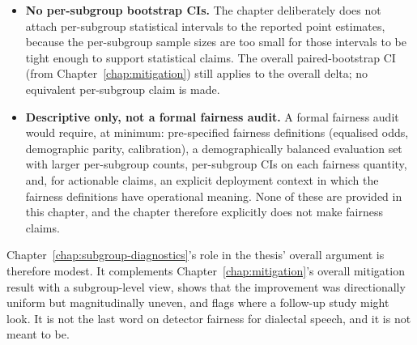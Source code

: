 \begin{itemize}
    \item \textbf{No per-subgroup bootstrap CIs.} The chapter deliberately
        does not attach per-subgroup statistical intervals to the
        reported point estimates, because the per-subgroup sample
        sizes are too small for those intervals to be tight enough to
        support statistical claims. The overall paired-bootstrap CI
        (from Chapter~\ref{chap:mitigation}) still applies to the overall delta; no
        equivalent per-subgroup claim is made.
    \item \textbf{Descriptive only, not a formal fairness audit.} A formal
        fairness audit would require, at minimum: pre-specified
        fairness definitions (equalised odds, demographic parity,
        calibration), a demographically balanced evaluation set with
        larger per-subgroup counts, per-subgroup CIs on each fairness
        quantity, and, for actionable claims, an explicit deployment
        context in which the fairness definitions have operational
        meaning. None of these are provided in this chapter, and the
        chapter therefore explicitly does not make fairness claims.
\end{itemize}

Chapter~\ref{chap:subgroup-diagnostics}'s role in the thesis' overall argument is therefore
modest. It complements Chapter~\ref{chap:mitigation}'s overall mitigation result
with a subgroup-level view, shows that the improvement was
directionally uniform but magnitudinally uneven, and flags where
a follow-up study might look. It is not the last word on detector
fairness for dialectal speech, and it is not meant to be.
